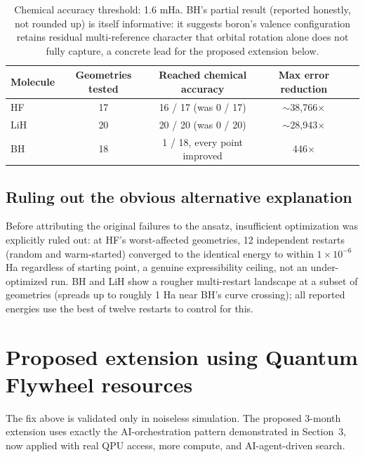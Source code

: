 \documentclass[11pt]{article}
\begin{document}
\begin{table}[h]
\centering
\small
\begin{tabular}{lcccc}
\toprule
Molecule & Geometries tested & Reached chemical accuracy & Max error reduction \\
\midrule
HF  & 17 & 16 / 17 (was 0 / 17) & $\sim$38,766$\times$ \\
LiH & 20 & 20 / 20 (was 0 / 20) & $\sim$28,943$\times$ \\
BH  & 18 & 1 / 18, every point improved & 446$\times$ \\
\bottomrule
\end{tabular}
\caption*{\footnotesize Chemical accuracy threshold: 1.6 mHa. BH's partial result (reported honestly, not rounded up) is itself informative: it suggests boron's valence configuration retains residual multi-reference character that orbital rotation alone does not fully capture, a concrete lead for the proposed extension below.}
\end{table}

\subsection{Ruling out the obvious alternative explanation}
Before attributing the original failures to the ansatz, insufficient optimization was explicitly ruled out: at HF's worst-affected geometries, 12 independent restarts (random and warm-started) converged to the identical energy to within $1\times10^{-6}$ Ha regardless of starting point, a genuine expressibility ceiling, not an under-optimized run. BH and LiH show a rougher multi-restart landscape at a subset of geometries (spreads up to roughly 1 Ha near BH's curve crossing); all reported energies use the best of twelve restarts to control for this.

\section{Proposed extension using Quantum Flywheel resources}
The fix above is validated only in noiseless simulation. The proposed 3-month extension uses exactly the AI-orchestration pattern demonstrated in Section~3, now applied with real QPU access, more compute, and AI-agent-driven search.
\end{document}
